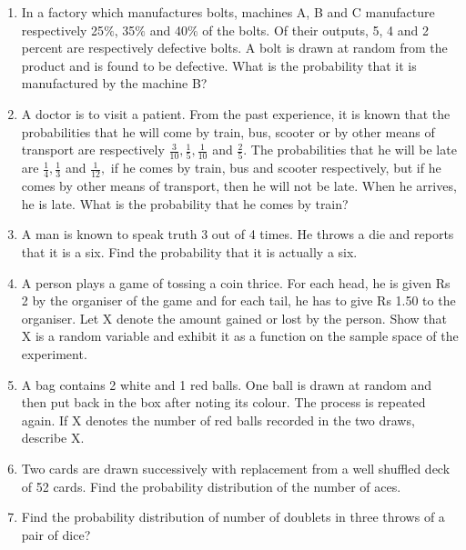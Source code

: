 \begin{enumerate}[label=\arabic*.,ref=\thesubsection.\theenumi]
\item In a factory which manufactures bolts, machines A, B and C manufacture respectively 25$\%$, 35$\%$ and 40$\%$ of the bolts. Of their outputs, 5, 4 and 2 percent are respectively defective bolts. A bolt is drawn at random from the product and is found to be defective. What is the probability that it is manufactured by the machine B?\\

\item A doctor is to visit a patient. From the past experience, it is known that the probabilities that he will come by train, bus, scooter or by other means of transport are respectively $\frac{3}{10},\frac{1}{5},\frac{1}{10}$ and $\frac{2}{5}.$ The probabilities that he will be late are $\frac{1}{4},\frac{1}{3}$ and $\frac{1}{12},$ if he comes by train, bus and scooter respectively, but if he comes by other means of transport, then he will not be late. When he arrives, he is late. What is the probability that he comes by train?\\

\item A man is known to speak truth 3 out of 4 times. He throws a die and reports that it is a six. Find the probability that it is actually a six.\\

\item A person plays a game of tossing a coin thrice. For each head, he is given Rs 2 by the organiser of the game and for each tail, he has to give Rs 1.50 to the organiser. Let X denote the amount gained or lost by the person. Show that X is a random variable and exhibit it as a function on the sample space of the experiment.\\

\item A bag contains 2 white and 1 red balls. One ball is drawn at random and then put back in the box after noting its colour. The process is repeated again. If X denotes the number of red balls recorded in the two draws, describe X.\\

\item Two cards are drawn successively with replacement from a well shuffled deck of 52 cards. Find the probability distribution of the number of aces.\\

\item Find the probability distribution of number of doublets in three throws of a pair of dice?\\


\end{enumerate}
